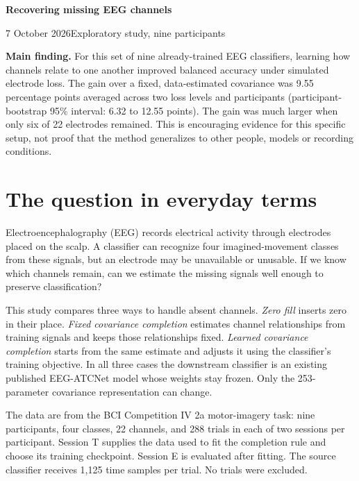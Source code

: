 \documentclass[11pt,a4paper]{article}
\begin{document}
\thispagestyle{empty}
{\Huge\bfseries\color{navy}Recovering missing EEG channels}\par
{}\par
\vspace{10pt}{\large Method, checks, results and limits}\par
\vspace{4pt}7 October 2026\quad\textbullet\quad Exploratory study, nine participants

\vspace{14pt}
\textbf{Main finding.} For this set of nine already-trained EEG classifiers, learning how channels relate to one another improved balanced accuracy under simulated electrode loss. The gain over a fixed, data-estimated covariance was 9.55 percentage points averaged across two loss levels and participants (participant-bootstrap 95\% interval: 6.32 to 12.55 points). The gain was much larger when only six of 22 electrodes remained. This is encouraging evidence for this specific setup, not proof that the method generalizes to other people, models or recording conditions.

\section{The question in everyday terms}
Electroencephalography (EEG) records electrical activity through electrodes placed on the scalp. A classifier can recognize four imagined-movement classes from these signals, but an electrode may be unavailable or unusable. If we know which channels remain, can we estimate the missing signals well enough to preserve classification?

This study compares three ways to handle absent channels. \emph{Zero fill} inserts zero in their place. \emph{Fixed covariance completion} estimates channel relationships from training signals and keeps those relationships fixed. \emph{Learned covariance completion} starts from the same estimate and adjusts it using the classifier's training objective. In all three cases the downstream classifier is an existing published EEG-ATCNet model whose weights stay frozen. Only the 253-parameter covariance representation can change.

The data are from the BCI Competition IV 2a motor-imagery task: nine participants, four classes, 22 channels, and 288 trials in each of two sessions per participant. Session T supplies the data used to fit the completion rule and choose its training checkpoint. Session E is evaluated after fitting. The source classifier receives 1,125 time samples per trial. No trials were excluded.
\end{document}

